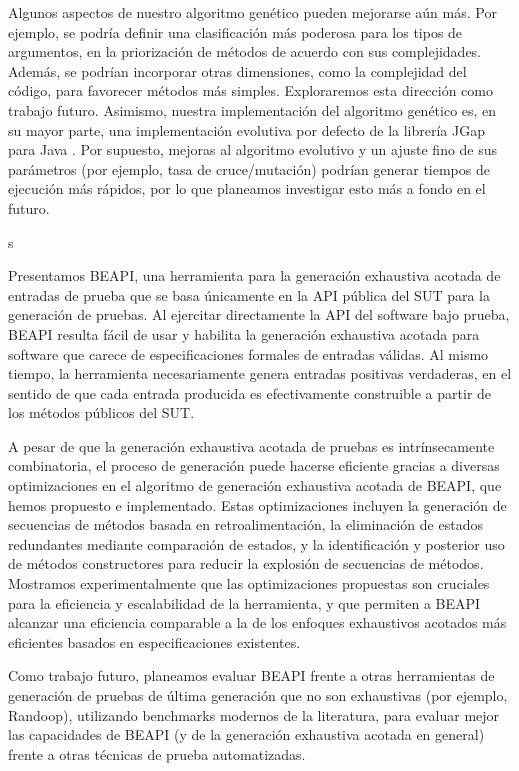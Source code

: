 Algunos aspectos de nuestro algoritmo genético pueden mejorarse aún más. 
Por ejemplo, se podría definir una clasificación más poderosa para los tipos de argumentos, en la priorización de métodos de acuerdo con sus complejidades. Además, se podrían incorporar otras dimensiones, 
como la complejidad del código, para favorecer métodos más simples. Exploraremos esta dirección como trabajo futuro. 
Asimismo, nuestra implementación del algoritmo genético es, en su mayor parte, una implementación evolutiva por defecto de la librería JGap para Java \cite{jgrapht}. 
Por supuesto, mejoras al algoritmo evolutivo y un ajuste fino de sus parámetros (por ejemplo, tasa de cruce/mutación) podrían generar tiempos de ejecución más rápidos, 
por lo que planeamos investigar esto más a fondo en el futuro.

s

Presentamos BEAPI, una herramienta para la generación exhaustiva acotada de entradas de prueba que se basa únicamente en la API pública del SUT para la generación de pruebas. 
Al ejercitar directamente la API del software bajo prueba, BEAPI resulta fácil de usar y habilita la generación exhaustiva acotada para software que carece de especificaciones formales de entradas válidas. 
Al mismo tiempo, la herramienta necesariamente genera entradas positivas verdaderas, en el sentido de que cada entrada producida es efectivamente construible a partir de los métodos públicos del SUT.

A pesar de que la generación exhaustiva acotada de pruebas es intrínsecamente combinatoria, 
el proceso de generación puede hacerse eficiente gracias a diversas optimizaciones en el algoritmo de generación exhaustiva acotada de BEAPI, que hemos propuesto e implementado. 
Estas optimizaciones incluyen la generación de secuencias de métodos basada en retroalimentación, la eliminación de estados redundantes mediante comparación de estados, y la identificación y posterior uso de métodos constructores para reducir la explosión de secuencias de métodos. 
Mostramos experimentalmente que las optimizaciones propuestas son cruciales para la eficiencia y escalabilidad de la herramienta, y que permiten a BEAPI alcanzar una eficiencia comparable a la de los enfoques exhaustivos acotados más eficientes basados en especificaciones existentes.

Como trabajo futuro, planeamos evaluar BEAPI frente a otras herramientas de generación de pruebas de última generación que no son exhaustivas (por ejemplo, Randoop), 
utilizando benchmarks modernos de la literatura, para evaluar mejor las capacidades de BEAPI (y de la generación exhaustiva acotada en general) 
frente a otras técnicas de prueba automatizadas.
